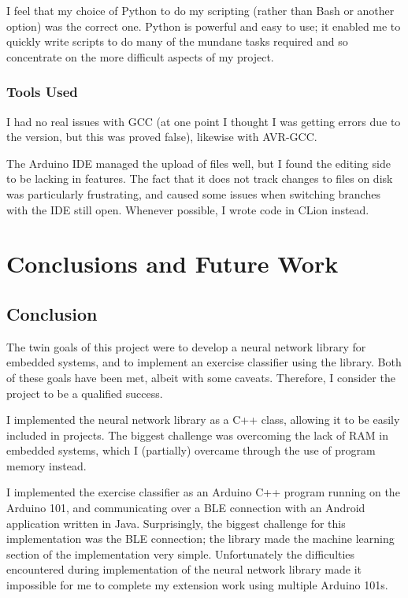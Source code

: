 \documentclass[a4paper]{article}
\begin{document}
I feel that my choice of Python to do my scripting (rather than Bash or another option) was the correct one. Python is powerful and easy to use; it enabled me to quickly write scripts to do many of the mundane tasks required and so concentrate on the more difficult aspects of my project. 

\subsubsection{Tools Used}
\label{subsubsec:ev_pm_tools}

I had no real issues with GCC (at one point I thought I was getting errors due to the version, but this was proved false), likewise with AVR-GCC.

The Arduino IDE managed the upload of files well, but I found the editing side to be lacking in features.  The fact that it does not track changes to files on disk was particularly frustrating, and caused some issues when switching branches with the IDE still open. Whenever possible, I wrote code in CLion instead.

\newpage
\section{Conclusions and Future Work}
\label{sec:fw}

\subsection{Conclusion}%
\label{subsec:fw_conclusion}

The twin goals of this project were to develop a neural network library for embedded systems, and to implement an exercise classifier using the library. Both of these goals have been met, albeit with some caveats. Therefore, I consider the project to be a qualified success.

I implemented the neural network library as a C++ class, allowing it to be easily included in projects. The biggest challenge was overcoming the lack of RAM in embedded systems, which I (partially) overcame through the use of program memory instead. 

I implemented the exercise classifier as an Arduino C++ program running on the Arduino 101, and communicating over a BLE connection with an Android application written in Java. 
Surprisingly, the biggest challenge for this implementation was the BLE connection; the library made the machine learning section of the implementation very simple.
Unfortunately the difficulties encountered during implementation of the neural network library made it impossible for me to complete my extension work using multiple Arduino 101s.
\end{document}
